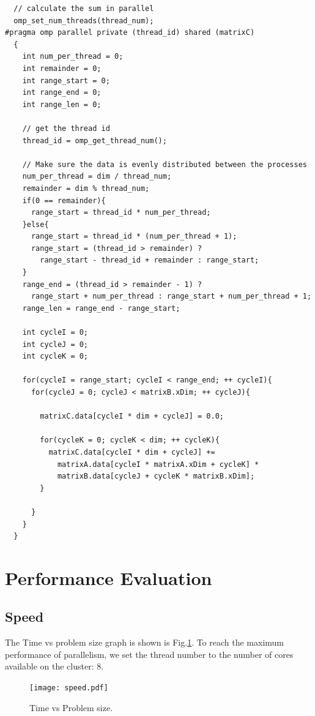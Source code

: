 \documentclass[12pt]{article}
\begin{document}
\small
\begin{verbatim}
  // calculate the sum in parallel
  omp_set_num_threads(thread_num);
#pragma omp parallel private (thread_id) shared (matrixC)
  {
    int num_per_thread = 0;
    int remainder = 0;
    int range_start = 0;
    int range_end = 0;
    int range_len = 0;

    // get the thread id
    thread_id = omp_get_thread_num();
    
    // Make sure the data is evenly distributed between the processes
    num_per_thread = dim / thread_num;
    remainder = dim % thread_num;
    if(0 == remainder){
      range_start = thread_id * num_per_thread;
    }else{
      range_start = thread_id * (num_per_thread + 1);
      range_start = (thread_id > remainder) ? 
        range_start - thread_id + remainder : range_start;
    }
    range_end = (thread_id > remainder - 1) ? 
      range_start + num_per_thread : range_start + num_per_thread + 1;
    range_len = range_end - range_start;

    int cycleI = 0;
    int cycleJ = 0;
    int cycleK = 0;

    for(cycleI = range_start; cycleI < range_end; ++ cycleI){
      for(cycleJ = 0; cycleJ < matrixB.xDim; ++ cycleJ){

        matrixC.data[cycleI * dim + cycleJ] = 0.0;

        for(cycleK = 0; cycleK < dim; ++ cycleK){
          matrixC.data[cycleI * dim + cycleJ] += 
            matrixA.data[cycleI * matrixA.xDim + cycleK] *
            matrixB.data[cycleJ + cycleK * matrixB.xDim];
        }

      }
    }
  }
\end{verbatim}
\normalsize
\section{Performance Evaluation}
\subsection{Speed}
The Time vs problem size graph is shown is Fig.\ref{fig:speed}.
To reach the maximum performance of parallelism, we set the 
thread number to the number of cores available on the cluster: 8.
\begin{figure}[h!]
	\begin{center}
		\texttt{[image: speed.pdf]}
		\caption{\label{fig:speed}Time vs Problem size.}
	\end{center}
\end{figure}
\end{document}
